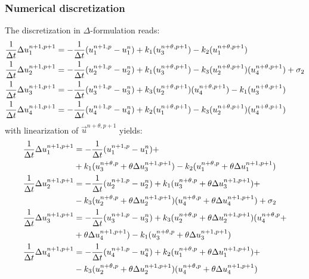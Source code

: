 \subsubsection{Numerical discretization}\label{sec:air_pollution_discretization}
The discretization in $\Delta$-formulation reads:
\begin{align}
    \frac{1}{\Delta t}\Delta u_1^{n+1, p+1} & = - \frac{1}{\Delta t}(u_1^{n+1,p} - u_1^n) + k_1 (u_3^{n+\theta,p+1}) - k_2 (u_1^{n+\theta,p+1})
    \\
    \frac{1}{\Delta t}\Delta u_2^{n+1, p+1} & = - \frac{1}{\Delta t}(u_2^{n+1,p} - u_2^n) + k_1(u_3^{n+\theta,p+1}) - k_3 (u_2^{n+\theta,p+1}) (u_4^{n+\theta,p+1}) +\sigma_2
    \\
    \frac{1}{\Delta t}\Delta u_3^{n+1, p+1} & = - \frac{1}{\Delta t}(u_3^{n+1,p} - u_3^n) + k_3 (u_2^{n+\theta,p+1}) (u_4^{n+\theta,p+1}) - k_1(u_3^{n+\theta,p+1})
    \\
    \frac{1}{\Delta t}\Delta u_4^{n+1, p+1} & = - \frac{1}{\Delta t}(u_4^{n+1,p} - u_4^n) + k_2(u_1^{n+\theta,p+1}) - k_3 (u_2^{n+\theta,p+1}) (u_4^{n+\theta,p+1})
\end{align}
with linearization of $\vec{u}^{n+\theta,p+1}$ yields:
\begin{align}
    \frac{1}{\Delta t}\Delta u_1^{n+1, p+1} & =
    - \frac{1}{\Delta t}(u_1^{n+1,p} - u_1^n) +
    \nonumber \\*
    & + k_1 (u_3^{n+\theta,p} + \theta \Delta u_3^{n+1, p+1}) - k_2 (u_1^{n+\theta,p} + \theta \Delta u_1^{n+1, p+1})
    \\
    \frac{1}{\Delta t}\Delta u_2^{n+1, p+1} & = - \frac{1}{\Delta t}(u_2^{n+1,p} - u_2^n) + k_1(u_3^{n+\theta,p} + \theta \Delta u_3^{n+1, p+1}) +
    \nonumber \\*
    & - k_3 (u_2^{n+\theta,p} + \theta \Delta u_2^{n+1, p+1}) (u_4^{n+\theta,p} + \theta \Delta u_4^{n+1, p+1}) +\sigma_2
    \\
    \frac{1}{\Delta t}\Delta u_3^{n+1, p+1} & = - \frac{1}{\Delta t}(u_3^{n+1,p} - u_3^n) + k_3 (u_2^{n+\theta,p} + \theta \Delta u_2^{n+1, p+1}) (u_4^{n+\theta,p} +
    \nonumber \\*
    & +  \theta \Delta u_4^{n+1, p+1}) - k_1(u_3^{n+\theta,p} + \theta \Delta u_3^{n+1, p+1})
    \\
    \frac{1}{\Delta t}\Delta u_4^{n+1, p+1} & = - \frac{1}{\Delta t}(u_4^{n+1,p} - u_4^n) + k_2(u_1^{n+\theta,p} + \theta \Delta u_1^{n+1, p+1}) +
    \nonumber \\*
    & - k_3 (u_2^{n+\theta,p} + \theta \Delta u_2^{n+1, p+1}) (u_4^{n+\theta,p} + \theta \Delta u_4^{n+1, p+1})
\end{align}
